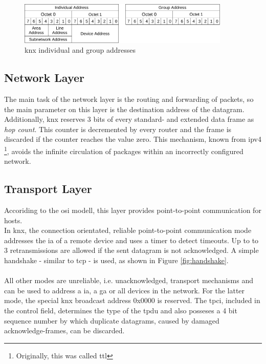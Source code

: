 \begin{figure}
 \centering
    \includegraphics[width=0.9\textwidth]{figures/addresses}
 \caption{\gls{knx} individual and group addresses} 
\label{fig:knxAddr}
\end{figure}


\subsection{Network Layer}

The main task of the network layer is the routing and forwarding of packets, so the main parameter on this layer is the destination address of the
datagram. Additionally, \gls{knx} reserves 3 bits of every standard- and extended data frame as
\textit{hop count}. This counter is decremented by every router and the frame is discarded if the counter reaches the value zero. This mechanism, known from
\gls{ipv4} \cite{rfc791} \footnote{Originally, this was called \gls{ttl}}, avoids the infinite circulation of packages within an incorrectly configured network.

\subsection{Transport Layer}\label{sec:knxTransportLayer}

Accoriding to the \gls{osi} modell, this layer provides point-to-point communication for hosts.
\\
In \gls{knx}, the connection orientated, reliable point-to-point communication mode addresses the \gls{ia} of a remote device and uses a timer to detect timeouts.
Up to to 3 retransmissions are allowed if the sent datagram is not acknowledged. A simple handshake - similar to \gls{tcp} - is used, as shown in Figure \ref{fig:handshake}.
\\
\\
All other modes are unreliable, i.e. unacknowledged, transport mechanisms and can be used to address a \gls{ia}, a \gls{ga} or all devices in the
network. For the latter mode, the special \gls{knx} broadcast address 0x0000 is reserved. 
The \gls{tpci}, included in the control field, determines the type of the \gls{tpdu} and also posseses a 4 bit sequence number by which duplicate datagrams, caused by damaged 
acknowledge-frames, can be discarded.

